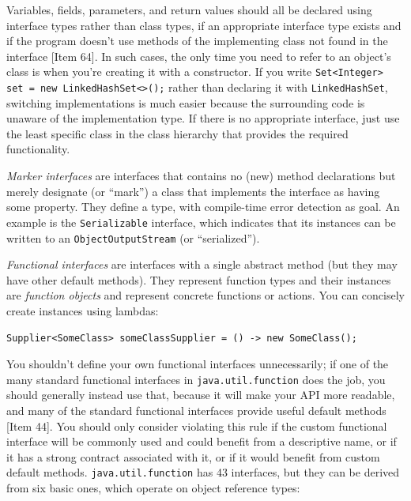 \documentclass[table, xcdraw]{article}%
\begin{document}
Variables, fields, parameters, and return values should all be declared using interface types rather than class types, if an appropriate interface type exists and if the program doesn't use methods of the implementing class not found in the interface [Item 64]. In such cases, the only time you need to refer to an object’s class is when you’re creating it with a constructor. If you write \texttt{Set<Integer> set = new LinkedHashSet<>();} rather than declaring it with \texttt{LinkedHashSet}, switching implementations is much easier because the surrounding code is unaware of the implementation type. If there is no appropriate interface, just use the least specific class in the class hierarchy that provides the required functionality.

\emph{Marker interfaces} are interfaces that contains no (new) method declarations but merely designate (or “mark”) a class that implements the interface as having some property. They define a type, with compile-time error detection as goal. An example is the \texttt{Serializable} interface, which indicates that its instances can be written to an \texttt{ObjectOutputStream} (or “serialized”).

\emph{Functional interfaces} are interfaces with a single abstract method (but they may have other default methods). They represent function types and their instances are \emph{function objects} and represent concrete functions or actions. You can concisely create instances using lambdas:

\begin{verbatim}
Supplier<SomeClass> someClassSupplier = () -> new SomeClass();
\end{verbatim}

You shouldn't define your own functional interfaces unnecessarily; if one of the many standard functional interfaces in \texttt{java.util.function} does the job, you should generally instead use that, because it will make your API more readable, and many of the standard functional interfaces provide useful default methods [Item 44]. You should only consider violating this rule if the custom functional interface will be commonly used and could benefit from a descriptive name, or if it has a strong contract associated with it, or if it would benefit from custom default methods. \texttt{java.util.function} has 43 interfaces, but they can be derived from six basic ones, which operate on object reference types:
\end{document}
